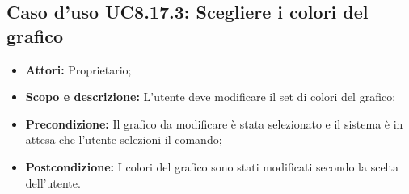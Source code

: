 \subsection{Caso d'uso UC8.17.3: Scegliere i colori del grafico}
\begin{itemize}
	\item \textbf{Attori:} Proprietario;
	\item \textbf{Scopo e descrizione:} L'utente deve modificare il set di colori del grafico;
	\item \textbf{Precondizione:} Il grafico da modificare è stata selezionato e il sistema è in attesa che l'utente selezioni il comando;
	\item \textbf{Postcondizione:} I colori del grafico sono stati modificati secondo la scelta dell'utente.
\end{itemize}